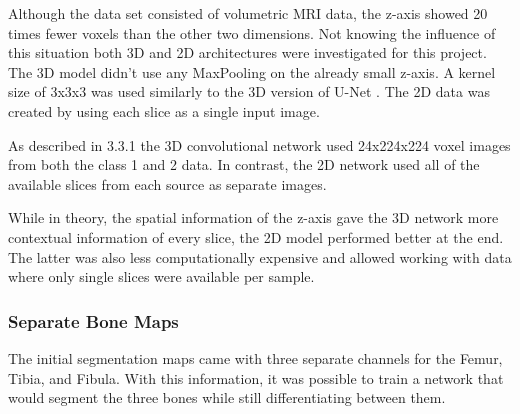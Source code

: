 Although the data set consisted of volumetric MRI data, the z-axis showed 20 times fewer voxels than the other two dimensions. Not knowing the influence of this situation both 3D and 2D architectures were investigated for this project. The 3D model didn't use any MaxPooling on the already small z-axis. A kernel size of 3x3x3 was used similarly to the 3D version of U-Net \cite{Cicek2016}. The 2D data was created by using each slice as a single input image.

As described in 3.3.1 the 3D convolutional network used 24x224x224 voxel images from both the class 1 and 2 data. In contrast, the 2D network used all of the available slices from each source as separate images.

While in theory, the spatial information of the z-axis gave the 3D network more contextual information of every slice, the 2D model performed better at the end. The latter was also less computationally expensive and allowed working with data where only single slices were available per sample.

\subsubsection{Separate Bone Maps}

The initial segmentation maps came with three separate channels for the Femur, Tibia, and Fibula. With this information, it was possible to train a network that would segment the three bones while still differentiating between them.

